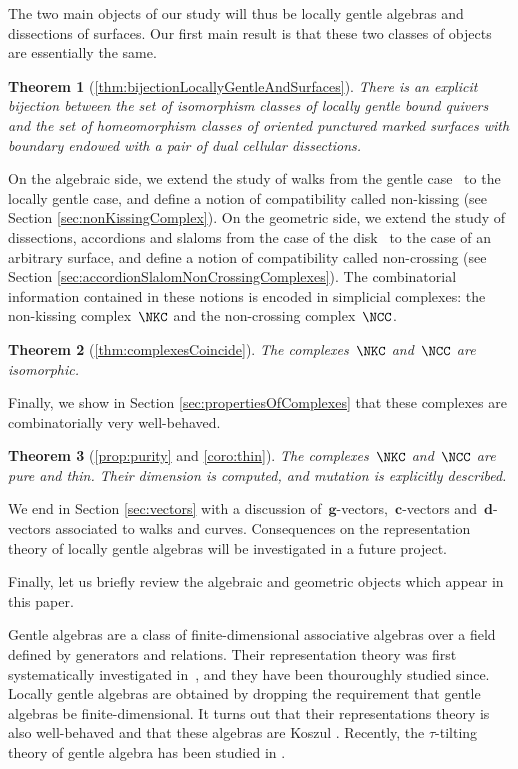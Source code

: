 \documentclass{amsart}
\newtheorem*{theorem*}{Theorem}%
\theoremstyle{definition}
\renewcommand{\b}[1]{\mathbf{#1}} %
\begin{document}
The two main objects of our study will thus be locally gentle algebras and dissections of surfaces.
Our first main result is that these two classes of objects are essentially the same.

\begin{theorem*}[\ref{thm:bijectionLocallyGentleAndSurfaces}]
 There is an explicit bijection between the set of isomorphism classes of locally gentle bound quivers and the set of homeomorphism classes of oriented punctured marked surfaces with boundary endowed with a pair of dual cellular dissections.
\end{theorem*}

On the algebraic side, we extend the study of walks from the gentle case~\cite{McConville, PaluPilaudPlamondon} to the locally gentle case, and define a notion of compatibility called non-kissing (see Section \ref{sec:nonKissingComplex}).
On the geometric side, we extend the study of dissections, accordions and slaloms from the case of the disk~\cite{GarverMcConville, MannevillePilaud-accordion} to the case of an arbitrary surface, and define a notion of compatibility called non-crossing (see Section \ref{sec:accordionSlalomNonCrossingComplexes}).
The combinatorial information contained in these notions is encoded in simplicial complexes: the non-kissing complex~$\NKC$ and the non-crossing complex~$\NCC$.

\begin{theorem*}[\ref{thm:complexesCoincide}]
 The complexes~$\NKC$ and~$\NCC$ are isomorphic.
\end{theorem*}

Finally, we show in Section \ref{sec:propertiesOfComplexes} that these complexes are combinatorially very well-behaved.

\begin{theorem*}[\ref{prop:purity} and \ref{coro:thin}]
 The complexes~$\NKC$ and~$\NCC$ are pure and thin.  Their dimension is computed, and mutation is explicitly described.
\end{theorem*}

We end in Section \ref{sec:vectors} with a discussion of~$\b{g}$-vectors,~$\b{c}$-vectors and~$\b{d}$-vectors associated to walks and curves.
Consequences on the representation theory of locally gentle algebras will be investigated in a future project.

Finally, let us briefly review the algebraic and geometric objects which appear in this paper.

Gentle algebras are a class of finite-dimensional associative algebras over a field defined by generators and relations.
Their representation theory was first systematically investigated in~\cite{ButlerRingel}, and they have been thouroughly studied since.
Locally gentle algebras are obtained by dropping the requirement that gentle algebras be finite-dimensional.
It turns out that their representations theory is also well-behaved \cite{Crawley-Boevey} and that these algebras are Koszul \cite{BessenrodtHolm}.
Recently, the $\tau$-tilting theory \cite{AdachiIyamaReiten} of gentle algebra has been studied in \cite{PaluPilaudPlamondon, BrustleDouvilleMousavandThomasYildirim}.
\end{document}
